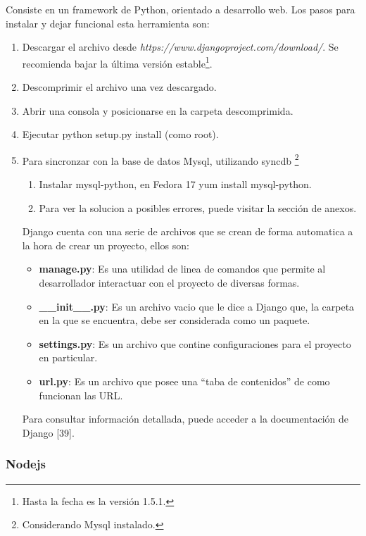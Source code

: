 Consiste en un framework de Python, orientado a desarrollo web. Los pasos para instalar y dejar funcional esta herramienta son:
\begin{enumerate}
 \item Descargar el archivo desde \textit{https://www.djangoproject.com/download/}. Se recomienda bajar la última versión 
       estable\footnote{Hasta la fecha es la versión 1.5.1.}.
 \item Descomprimir el archivo una vez descargado.
 \item Abrir una consola  y posicionarse en la carpeta descomprimida.
 \item Ejecutar python setup.py install (como root).
 \item Para sincronzar con la base de datos Mysql, utilizando syncdb \footnote{Considerando Mysql instalado.}
 \begin{enumerate}
  \item Instalar mysql-python, en Fedora 17 yum install mysql-python.
  \item Para ver la solucion a posibles errores, puede visitar la sección de anexos.
 \end{enumerate}

Django cuenta con una serie de archivos que se crean de forma automatica a la hora de crear un proyecto, ellos son:
\begin{itemize}
 \item \textbf{manage.py}: Es una utilidad de linea de comandos que permite al desarrollador interactuar con el proyecto de diversas 
      formas.
 \item \textbf{\_\_init\_\_.py}: Es un archivo vacio que le dice a Django que, la carpeta en la que se encuentra, debe ser considerada como
      un paquete.
 \item \textbf{settings.py}: Es un archivo que contine configuraciones para el proyecto en particular.
 \item \textbf{url.py}: Es un archivo que posee una ``taba de contenidos'' de como funcionan las URL.
\end{itemize}
Para consultar información detallada, puede acceder a la documentación de Django [39].



\end{enumerate}



\subsubsection{Nodejs}

